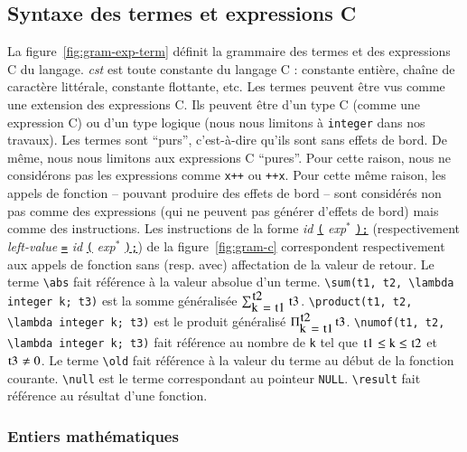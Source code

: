 \subsection{Syntaxe des termes \eacsl et expressions C}



La figure~\ref{fig:gram-exp-term} définit la grammaire des termes \eacsl et des
expressions C du langage.
\textit{cst} est toute constante du langage C : constante entière, chaîne de
caractère littérale, constante flottante, etc.
Les termes \eacsl peuvent être vus comme une extension des expressions C.
Ils peuvent être d'un type C (comme une expression C) ou d'un type logique (nous
nous limitons à \lstinline'integer' dans nos travaux).
Les termes sont ``purs'', c'est-à-dire qu'ils sont sans effets de bord.
De même, nous nous limitons aux expressions C ``pures''.
Pour cette raison, nous ne considérons pas les expressions comme \lstinline'x++'
ou \lstinline'++x'.
Pour cette même raison, les appels de fonction -- pouvant produire des effets 
de bord -- sont considérés non pas comme des expressions (qui ne peuvent pas
générer d'effets de bord) mais comme des instructions.
Les instructions de la forme \textit{id} \underline{\lstinline'('}
\textit{exp}$^{*}$ \underline{\lstinline');'} (respectivement
\textit{left-value} \underline{\lstinline'='} \textit{id}
\underline{\lstinline'('} \textit{exp}$^{*}$ \underline{\lstinline');'}) de la
figure~\ref{fig:gram-c} correspondent respectivement aux appels de fonction sans
(resp. avec) affectation de la valeur de retour.
Le terme \lstinline'\abs' fait référence à la valeur absolue d'un terme.
\lstinline'\sum(t1, t2, \lambda integer k; t3)' est la somme généralisée
$\sum_{\mbox{\lstinline'k = t1'}}^{\mbox{\lstinline't2'}}\mbox{\lstinline't3'}$.
\lstinline'\product(t1, t2, \lambda integer k; t3)' est le produit
généralisé $\Pi_{\mbox{\lstinline'k = t1'}}^{\mbox{\lstinline't2'}}\mbox{\lstinline't3'}$.
\lstinline'\numof(t1, t2, \lambda integer k; t3)' fait référence au nombre de
\lstinline'k' tel que
$\mbox{\lstinline't1'} \le \mbox{\lstinline'k'} \le \mbox{\lstinline't2'}$ et
$\mbox{\lstinline't3'} \neq 0$.
Le terme \lstinline'\old' fait référence à la valeur du terme au début de la
fonction courante.
\lstinline'\null' est le terme correspondant au pointeur \lstinline'NULL'.
\lstinline{\result} fait référence au résultat d'une fonction.


\subsubsection{Entiers mathématiques}
\label{sec:eacsl-integers}


